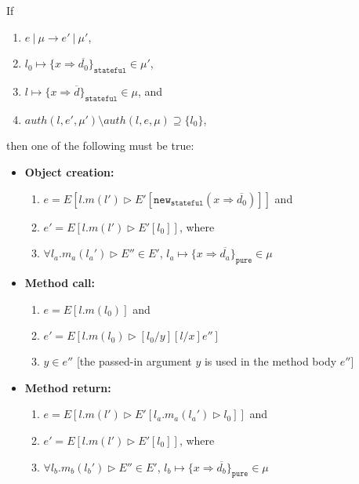 \documentclass{llncs}
\newcommand{\keywadj}[1]{\mathtt{#1}}
\newcommand{\intuition}[1]{#1}
\begin{document}
\newpage
\begin{theorem} If
\begin{enumerate}
\item $e~|~\mu \longrightarrow e'~|~\mu'$,
\item $l_0 \mapsto \{ x \Rightarrow \overline{d_0} \}_{\keywadj{stateful}} \in \mu'$,
\item $l \mapsto \{ x \Rightarrow \overline{d} \}_{\keywadj{stateful}} \in \mu$, and
\item $auth(l, e', \mu') \setminus auth(l, e, \mu) \supseteq \{ l_0 \}$,
\end{enumerate}
then one of the following must be true:
\begin{itemize}
\item \textbf{Object creation:}
\begin{enumerate}
\item $e = E[l.m(l') \rhd E'[\keywadj{new}_{\keywadj{stateful}}(x \Rightarrow \overline{d_0})]]$ and
\item $e' = E[l.m(l') \rhd E'[l_0]]$, where
\item $\forall l_a.m_a(l_a') \rhd E'' \in E'$, $l_a \mapsto \{ x \Rightarrow \overline{d_a}\}_{\keywadj{pure}} \in \mu$ \intuition{}
\end{enumerate}

\item \textbf{Method call:}
\begin{enumerate}
\item $e = E[l.m(l_0)]$ and
\item $e' = E[l.m(l_0) \rhd [l_0/y][l/x]e'']$
\item $y \in e''$ \intuition{\hspace{100pt} [the passed-in argument $y$ is used in the method body $e''$]}
\end{enumerate}

\item \textbf{Method return:}
\begin{enumerate}
\item $e = E[l.m(l') \rhd E'[l_a.m_a(l_a') \rhd l_0]]$ and
\item $e' = E[l.m(l') \rhd E'[l_0]]$, where
\item $\forall l_b.m_b(l_b') \rhd E'' \in E'$, $l_b \mapsto \{ x \Rightarrow \overline{d_b}\}_{\keywadj{pure}} \in \mu$ \intuition{}
\end{enumerate}
\end{itemize}

\end{theorem}
\end{document}
